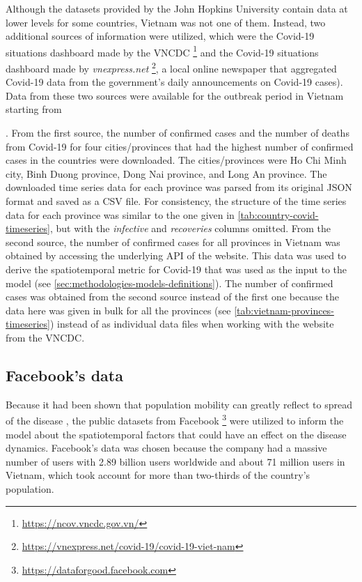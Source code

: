 Although the datasets provided by the John Hopkins University contain data at lower levels for some countries, Vietnam was not one of them.
Instead, two additional sources of information were utilized, which were the Covid-19 situations dashboard made by the \gls{VNCDC} \footnote{\url{https://ncov.vncdc.gov.vn/}} and the Covid-19 situations dashboard made by \textit{vnexpress.net} \footnote{\url{https://vnexpress.net/covid-19/covid-19-viet-nam}}, a local online newspaper that aggregated Covid-19 data from the government's daily announcements on Covid-19 cases).
Data from these two sources were available for the outbreak period in Vietnam starting from \date{27th April 2021}.
From the first source, the number of confirmed cases and the number of deaths from Covid-19 for four cities/provinces that had the highest number of confirmed cases in the countries were downloaded.
The cities/provinces were Ho Chi Minh city, Binh Duong province, Dong Nai province, and Long An province.
The downloaded time series data for each province was parsed from its original \gls{JSON} format and saved as a \gls{CSV} file.
For consistency, the structure of the time series data for each province was similar to the one given in \autoref{tab:country-covid-timeseries}, but with the \textit{infective} and \textit{recoveries} columns omitted.
From the second source, the number of confirmed cases for all provinces in Vietnam was obtained by accessing the underlying \gls{API} of the website.
This data was used to derive the spatiotemporal metric for Covid-19 that was used as the input to the model (see \autoref{sec:methodologies-models-definitions}).
The number of confirmed cases was obtained from the second source instead of the first one because the data here was given in bulk for all the provinces (see \autoref{tab:vietnam-provinces-timeseries}) instead of as individual data files when working with the website from the \gls{VNCDC}.

\subsection{Facebook's data}
\label{sec:methodologies-data-mobility-data}

Because it had been shown that population mobility can greatly reflect to spread of the disease \cite{changMobilityNetworkModels2021,liSubstantialUndocumentedInfection2020,ihmecovid-19forecastingteamModelingCOVID19Scenarios2021}, the public datasets from Facebook \footnote{\url{https://dataforgood.facebook.com}} were utilized to inform the model about the spatiotemporal factors that could have an effect on the disease dynamics.
Facebook's data was chosen because the company had a massive number of users with 2.89 billion users worldwide and about 71 million users in Vietnam, which took account for more than two-thirds of the country's population.

